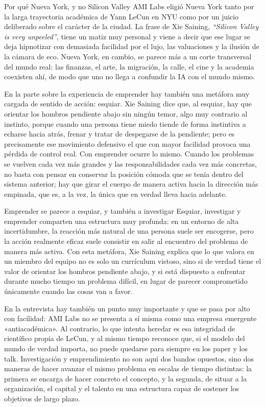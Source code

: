 \begin{knowledgebox}{Por qué Nueva York, y no Silicon Valley}
AMI Labs eligió Nueva York tanto por la larga trayectoria académica de Yann LeCun en NYU como por un juicio deliberado sobre el carácter de la ciudad. La frase de Xie Saining, \textit{``Silicon Valley is very unpeeled''}, tiene un matiz muy personal y viene a decir que ese lugar se deja hipnotizar con demasiada facilidad por el lujo, las valuaciones y la ilusión de la cámara de eco. Nueva York, en cambio, se parece más a un corte transversal del mundo real: las finanzas, el arte, la migración, la calle, el cine y la academia coexisten ahí, de modo que uno no llega a confundir la IA con el mundo mismo.
\end{knowledgebox}

En la parte sobre la experiencia de emprender hay también una metáfora muy cargada de sentido de acción: esquiar. Xie Saining dice que, al esquiar, hay que orientar los hombros pendiente abajo sin ningún temor, algo muy contrario al instinto, porque cuando una persona tiene miedo tiende de forma instintiva a echarse hacia atrás, frenar y tratar de despegarse de la pendiente; pero es precisamente ese movimiento defensivo el que con mayor facilidad provoca una pérdida de control real. Con emprender ocurre lo mismo. Cuando los problemas se vuelven cada vez más grandes y las responsabilidades cada vez más concretas, no basta con pensar en conservar la posición cómoda que se tenía dentro del sistema anterior; hay que girar el cuerpo de manera activa hacia la dirección más empinada, que es, a la vez, la única que en verdad lleva hacia adelante.

\begin{importantbox}{Emprender se parece a esquiar, y también a investigar}
Esquiar, investigar y emprender comparten una estructura muy profunda: en un entorno de alta incertidumbre, la reacción más natural de una persona suele ser encogerse, pero la acción realmente eficaz suele consistir en salir al encuentro del problema de manera más activa. Con esta metáfora, Xie Saining explica que lo que valora en un miembro del equipo no es solo un currículum vistoso, sino si de verdad tiene el valor de orientar los hombros pendiente abajo, y si está dispuesto a enfrentar durante mucho tiempo un problema difícil, en lugar de parecer comprometido únicamente cuando las cosas van a favor.
\end{importantbox}

En la entrevista hay también un punto muy importante y que se pasa por alto con facilidad: AMI Labs no se presenta a sí misma como una empresa emergente «antiacadémica». Al contrario, lo que intenta heredar es esa integridad de científico propia de LeCun, y al mismo tiempo reconoce que, si el modelo del mundo de verdad importa, no puede quedarse para siempre en los paper y los talk. Investigación y emprendimiento no son aquí dos bandos opuestos, sino dos maneras de hacer avanzar el mismo problema en escalas de tiempo distintas: la primera se encarga de hacer concreto el concepto, y la segunda, de situar a la organización, el capital y el talento en una estructura capaz de sostener los objetivos de largo plazo.

